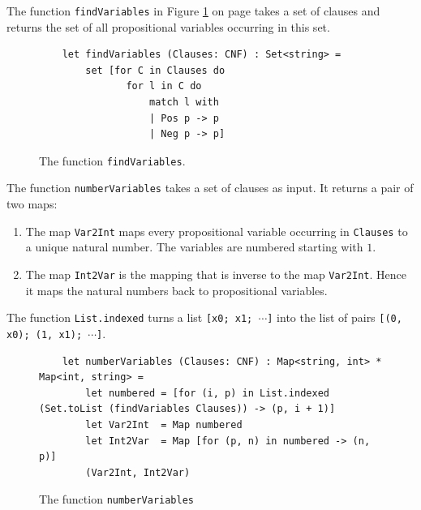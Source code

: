 The function \texttt{findVariables} in Figure \ref{fig:sudoku-findVariables} on page
\pageref{fig:sudoku-findVariables} takes a set of clauses and returns the set of all propositional variables
occurring in this set.

\begin{figure}[!ht]
\centering
\begin{verbatim}
    let findVariables (Clauses: CNF) : Set<string> =
        set [for C in Clauses do
               for l in C do
                   match l with
                   | Pos p -> p
                   | Neg p -> p]
\end{verbatim}
\vspace*{-0.3cm}
\caption{The function \texttt{findVariables}.}
\label{fig:sudoku-findVariables}
\end{figure}

The function \texttt{numberVariables} takes a set of clauses as input.  It returns a pair of two maps:
\begin{enumerate}
\item The map \texttt{Var2Int} maps every propositional variable occurring in \texttt{Clauses} to a
      unique natural number.  The variables are numbered starting with $1$.
\item The map \texttt{Int2Var} is the mapping that is inverse to the map \texttt{Var2Int}.
      Hence it maps the natural numbers back to propositional variables.
\end{enumerate}
The function \texttt{List.indexed} turns a list \texttt{[x0; x1; $\cdots$]} into the list of pairs
\texttt{[(0, x0); (1, x1); $\cdots$]}.

\begin{figure}[!ht]
\centering
\begin{verbatim}
    let numberVariables (Clauses: CNF) : Map<string, int> * Map<int, string> =
        let numbered = [for (i, p) in List.indexed (Set.toList (findVariables Clauses)) -> (p, i + 1)]
        let Var2Int  = Map numbered
        let Int2Var  = Map [for (p, n) in numbered -> (n, p)]
        (Var2Int, Int2Var)
\end{verbatim}
\vspace*{-0.3cm}
\caption{The function \texttt{numberVariables}}
\label{fig:sudoku-numberVariables}
\end{figure}

